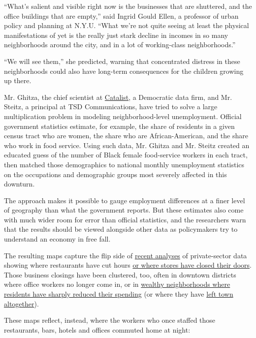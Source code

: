 ``What's salient and visible right now is the businesses that are
shuttered, and the office buildings that are empty,'' said Ingrid Gould
Ellen, a professor of urban policy and planning at N.Y.U. ``What we're
not quite seeing at least the physical manifestations of yet is the
really just stark decline in incomes in so many neighborhoods around the
city, and in a lot of working-class neighborhoods.''

``We will see them,'' she predicted, warning that concentrated distress
in these neighborhoods could also have long-term consequences for the
children growing up there.

Mr. Ghitza, the chief scientist at
\href{https://catalist.us/}{Catalist}, a Democratic data firm, and Mr.
Steitz, a principal at TSD Communications, have tried to solve a large
multiplication problem in modeling neighborhood-level unemployment.
Official government statistics estimate, for example, the share of
residents in a given census tract who are women, the share who are
African-American, and the share who work in food service. Using such
data, Mr. Ghitza and Mr. Steitz created an educated guess of the number
of Black female food-service workers in each tract, then matched those
demographics to national monthly unemployment statistics on the
occupations and demographic groups most severely affected in this
downturn.

The approach makes it possible to gauge employment differences at a
finer level of geography than what the government reports. But these
estimates also come with much wider room for error than official
statistics, and the researchers warn that the results should be viewed
alongside other data as policymakers try to understand an economy in
free fall.

The resulting maps capture the flip side of
\href{https://www.tracktherecovery.org/}{recent analyses} of
private-sector data showing where restaurants have cut hours
\href{https://www.nytimes.com/2020/08/03/nyregion/nyc-small-businesses-closing-coronavirus.html}{or
where stores have closed their doors}. Those business closings have been
clustered, too, often in downtown districts where office workers no
longer come in, or in
\href{https://www.nytimes.com/2020/06/17/upshot/coronavirus-spending-rich-poor.html}{wealthy
neighborhoods where residents have sharply reduced their spending} (or
where they have
\href{https://www.nytimes.com/interactive/2020/05/15/upshot/who-left-new-york-coronavirus.html}{left
town altogether}).

These maps reflect, instead, where the workers who once staffed those
restaurants, bars, hotels and offices commuted home at night:

